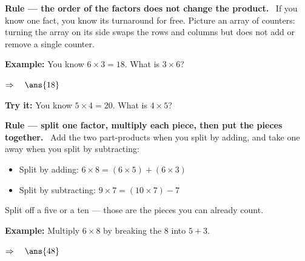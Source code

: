 \documentclass[12pt]{article}
\begin{document}


\begin{formulabox}
\textbf{Rule --- the order of the factors does not change the product.} \ If you know one fact, you know its turnaround for free. Picture an array of counters: turning the array on its side swaps the rows and columns but does not add or remove a single counter.
\end{formulabox}

\begin{examplebox}
\textbf{Example:} \quad You know $6 \times 3 = 18$. What is $3 \times 6$?


$\Rightarrow\quad \ans{18}$
\end{examplebox}

\begin{tryitbox}
\textbf{Try it:} \quad You know $5 \times 4 = 20$. What is $4 \times 5$?\\[2pt]
\end{tryitbox}


\begin{formulabox}
\textbf{Rule --- split one factor, multiply each piece, then put the pieces together.} \ Add the two part-products when you split by adding, and take one away when you split by subtracting:
\begin{itemize}[leftmargin=0.8cm, itemsep=0pt, topsep=2pt]
  \item Split by adding: $6 \times 8 = (6 \times 5) + (6 \times 3)$
  \item Split by subtracting: $9 \times 7 = (10 \times 7) - 7$
\end{itemize}
Split off a five or a ten --- those are the pieces you can already count.
\end{formulabox}

\begin{examplebox}
\textbf{Example:} \quad Multiply $6 \times 8$ by breaking the $8$ into $5 + 3$.


$\Rightarrow\quad \ans{48}$
\end{examplebox}
\end{document}
